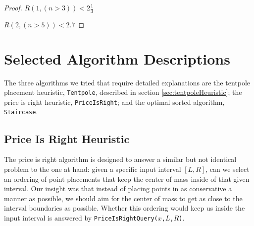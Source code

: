 \documentclass[11pt,twocolumn]{article}
\begin{document}
\begin{proof}
\textbf{$R(1,(n>3)) < 2\frac13$}



\textbf{$R(2,(n>5)) < 2.7$}

\end{proof}

\section{Selected Algorithm Descriptions}

The three algorithms we tried that require detailed explanations are the tentpole placement heuristic,  \texttt{Tentpole}, described in section \ref{sec:tentpoleHeuristic}; the price is right heuristic, \texttt{PriceIsRight}; and the optimal sorted algorithm, \texttt{Staircase}.

\subsection{Price Is Right Heuristic} \label{subs:PIR}

The price is right algorithm is designed to answer a similar but not identical problem to the one at hand: given a specific input interval $[L,R]$, can we select an ordering of point placements that keep the center of mass inside of that given interval.  Our insight was that instead of placing points in as conservative a manner as possible, we should aim for the center of mass to get as close to the interval boundaries as possible.  Whether this ordering would keep us inside the input interval is answered by \texttt{PriceIsRightQuery($x$,$L$,$R$)}.
\end{document}
